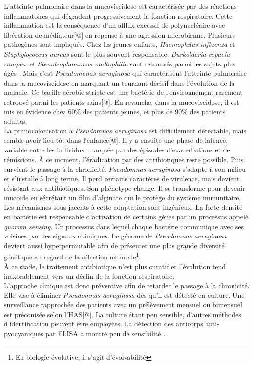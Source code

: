 \documentclass[12pt,a4paper]{article}
\begin{document}
L’atteinte pulmonaire dans la mucoviscidose est caractérisée par des réactions inflammatoires qui dégradent progressivement la fonction respiratoire. Cette inflammation est la conséquence d'un afflux excessif de polynucléaire avec libération de médiateur[@] en réponse à une agression microbienne. Plusieurs pathogènes sont impliqués. Chez les jeunes enfants\cite{Davies}, \textit{Haemophilus influenza} et \textit{Staphylococcus aureus} sont le plus souvent responsable. \textit{Burkolderia cepacia complex} et \textit{Stenotrophomonas maltophilia} sont retrouvés parmi les sujets plus âgés \cite{Davies}.
Mais c’est \textit{Pseudomonas aeruginosa} qui caractérisent l’atteinte pulmonaire dans la mucoviscidose en marquant un tournant décisif dans l’évolution de la maladie. Ce bacille aérobie stricte est une bactérie de l'environnement rarement retrouvé parmi les patients sains[@]. En revanche, dans la mucoviscidose, il est mis en évidence chez 60\%\cite{LeBourgeois} des patients jeunes, et plus de 90\% des patients adultes\cite{LeBourgeois}.\\
La primocolonisation à \textit{Pseudomnas aeruginosa} est difficilement détectable, mais semble avoir lieu tôt dans l’enfance[@]. Il y a ensuite une phase de latence, variable entre les individus, marquée par des épisodes d’exacerbations et de rémissions. À ce moment, l’éradication par des antibiotiques reste possible.
Puis survient le passage à la chronicité. \textit{Pseudomnas aeruginosa} s'adapte à son milieu et s’installe à long terme. Il perd certains caractères de virulence, mais devient résistant aux antibiotiques\cite{LeBourgeois}. Son phénotype change. Il se transforme pour devenir mucoïde en sécrétant un film d’alginate qui le protège du système immunitaire. Les mécanismes sous-jacents à cette adaptation sont ingénieux. La forte densité en bactérie est responsable d’activation de certains gènes par un processus appelé \textit{quorum sensing}\cite{Ruimy2004}. Un processus dans lequel chaque bactérie communique avec ses voisines par des signaux chimiques.
Le génome de \textit{Pseudomnas aeruginosa} devient aussi hyperpermutable\cite{Davies} afin de présenter une plus grande diversité génétique au regard de la sélection naturelle\footnote{En biologie évolutive, il s'agit d'évolvabilité}. \\
À ce stade, le traitement antibiotique n’est plus curatif et l'évolution tend inexorablement vers un déclin de la fonction respiratoire. \\
L'approche clinique est donc préventive afin de retarder le passage à la chronicité. Elle vise à éliminer \textit{Pseudomnas aeruginosa} dès qu'il est détecté en culture. Une surveillance rapprochée des patients avec un prélèvement mensuel ou bimensuel est préconisée selon l'HAS[@]. La culture étant peu sensible, d’autres méthodes d'identification peuvent être employées. La détection des anticorps anti-pyocyaniques par ELISA a montré peu de sensibilité \cite{Plesiat}.
\end{document}
